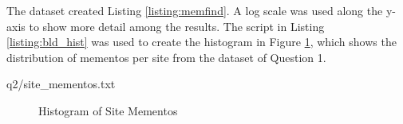 \vspace{5mm}
The dataset created Listing \ref{listing:memfind}. A log scale was used along the y-axis to show more detail among the results. The script in Listing \ref{listing:bld_hist} was used to create the histogram in Figure \ref{fig:hist_ss}, which shows the distribution of mementos per site from the dataset of Question 1.
\vspace{2mm}

\vspace{2mm}

{q2/site_mementos.txt}
\vspace*{5pt}
\begin{figure}[h]
\centering
{}
\caption{Histogram of Site Mementos}
\label{fig:hist_ss}
\end{figure}
